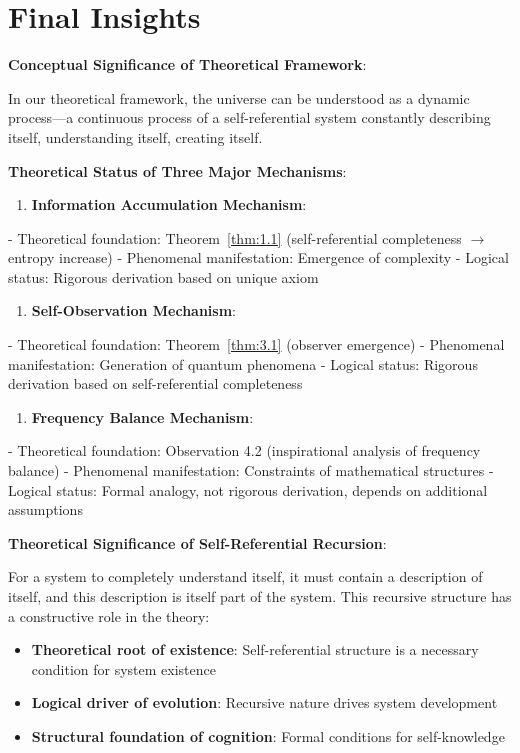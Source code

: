 \section{Final Insights}
\label{sec:ch08_conclusion:final-insights}

\textbf{Conceptual Significance of Theoretical Framework}:

In our theoretical framework, the universe can be understood as a dynamic process---a continuous process of a self-referential system constantly describing itself, understanding itself, creating itself.

\textbf{Theoretical Status of Three Major Mechanisms}:

\begin{enumerate}
\item \textbf{Information Accumulation Mechanism}:
\end{enumerate}
   - Theoretical foundation: Theorem~\ref{thm:1.1} (self-referential completeness $\rightarrow$ entropy increase)
   - Phenomenal manifestation: Emergence of complexity
   - Logical status: Rigorous derivation based on unique axiom

\begin{enumerate}
\item \textbf{Self-Observation Mechanism}:
\end{enumerate}
   - Theoretical foundation: Theorem~\ref{thm:3.1} (observer emergence)
   - Phenomenal manifestation: Generation of quantum phenomena
   - Logical status: Rigorous derivation based on self-referential completeness

\begin{enumerate}
\item \textbf{Frequency Balance Mechanism}:
\end{enumerate}
   - Theoretical foundation: Observation 4.2 (inspirational analysis of frequency balance)
   - Phenomenal manifestation: Constraints of mathematical structures
   - Logical status: Formal analogy, not rigorous derivation, depends on additional assumptions

\textbf{Theoretical Significance of Self-Referential Recursion}:

For a system to completely understand itself, it must contain a description of itself, and this description is itself part of the system. This recursive structure has a constructive role in the theory:

\begin{itemize}
\item \textbf{Theoretical root of existence}: Self-referential structure is a necessary condition for system existence
\item \textbf{Logical driver of evolution}: Recursive nature drives system development
\item \textbf{Structural foundation of cognition}: Formal conditions for self-knowledge
\end{itemize}

